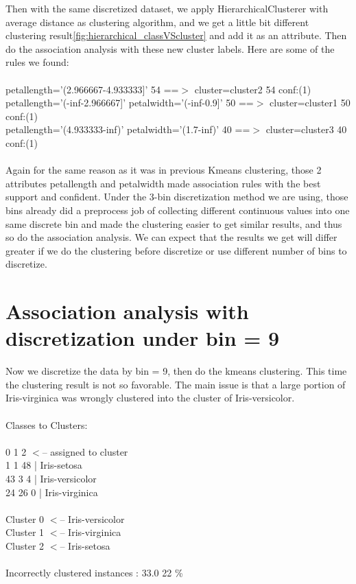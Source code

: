 \documentclass{article}
\begin{document}
Then with the same discretized dataset, we apply HierarchicalClusterer with average distance as clustering algorithm, and we get a little bit different clustering result\ref{fig:hierarchical_classVScluster} and add it as an attribute. Then do the association analysis with these new cluster labels. Here are some of the rules we found:\\
\\
petallength='(2.966667-4.933333]' 54 ==$>$ cluster=cluster2 54    conf:(1) \\
petallength='(-inf-2.966667]' petalwidth='(-inf-0.9]' 50 ==$>$ cluster=cluster1 50    conf:(1)\\
petallength='(4.933333-inf)' petalwidth='(1.7-inf)' 40 ==$>$ cluster=cluster3 40    conf:(1)\\
\\

Again for the same reason as it was in previous Kmeans clustering, those 2 attributes petallength and petalwidth made association rules with the best support and confident. Under the 3-bin discretization method we are using, those bins already did a preprocess job of collecting different continuous values into one same discrete bin and made the clustering easier to get similar results, and thus so do the association analysis. We can expect that the results we get will differ greater if we do the clustering before discretize or use different number of bins to discretize.

\section{Association analysis with discretization under bin = 9}

Now we discretize the data by bin = 9, then do the kmeans clustering. This time the clustering result is not so favorable. The main issue is that a large portion of Iris-virginica was wrongly clustered into the cluster of Iris-versicolor.\\
\\
Classes to Clusters:\\
\\
  0  1  2  $<$-- assigned to cluster\\
  1  1 48 | Iris-setosa\\
 43  3  4 | Iris-versicolor\\
 24 26  0 | Iris-virginica\\
\\
Cluster 0 $<$-- Iris-versicolor\\
Cluster 1 $<$-- Iris-virginica\\
Cluster 2 $<$-- Iris-setosa\\
\\
Incorrectly clustered instances :	33.0	 22      \% \\
\\
\end{document}
